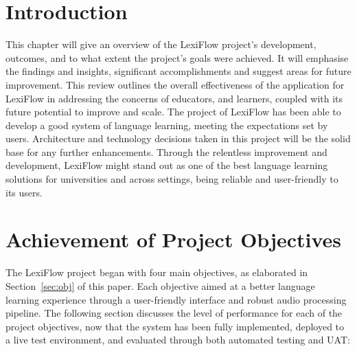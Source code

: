 \documentclass[oneside]{utmthesis}
\begin{document}
\section{Introduction}
This chapter will give an overview of the LexiFlow project's development, outcomes, and to what extent the project’s goals were achieved. It will emphasise the findings and insights, significant accomplishments and suggest areas for future improvement. This review outlines the overall effectiveness of the application for LexiFlow in addressing the concerns of educators, and learners, coupled with its future potential to improve and scale. The project of LexiFlow has been able to develop a good system of language learning, meeting the expectations set by users. Architecture and technology decisions taken in this project will be the solid base for any further enhancements. Through the relentless improvement and development, LexiFlow might stand out as one of the best language learning solutions for universities and across settings, being reliable and user-friendly to its users.

\section{Achievement of Project Objectives}
The LexiFlow project began with four main objectives, as elaborated in Section~\ref{sec:obj} of this paper. Each objective aimed at a better language learning experience through a user-friendly interface and robust audio processing pipeline. The following section discusses the level of performance for each of the project objectives, now that the system has been fully implemented, deployed to a live test environment, and evaluated through both automated testing and UAT:
\end{document}
